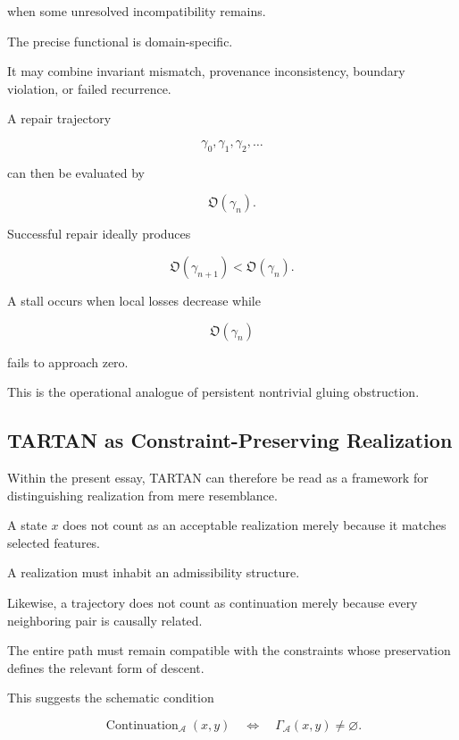 \documentclass[
  11pt,
  a4paper,
  DIV=12,
  BCOR=0mm,
  parskip=half-
]{scrartcl}
\newcommand{\Continuation}{\operatorname{Continuation}}
\theoremstyle{definition}
\theoremstyle{plain}
\theoremstyle{remark}
\begin{document}
when some unresolved incompatibility remains.

The precise functional is domain-specific.

It may combine invariant mismatch, provenance inconsistency, boundary
violation, or failed recurrence.

A repair trajectory

\[
  \gamma_0,
  \gamma_1,
  \gamma_2,
  \ldots
\]

can then be evaluated by

\[
  \mathfrak O(\gamma_n).
\]

Successful repair ideally produces

\[
  \mathfrak O(\gamma_{n+1})
  <
  \mathfrak O(\gamma_n).
\]

A stall occurs when local losses decrease while

\[
  \mathfrak O(\gamma_n)
\]

fails to approach zero.

This is the operational analogue of persistent nontrivial gluing obstruction.


\subsection{TARTAN as Constraint-Preserving Realization}
\label{app:tartan-interpretation}

Within the present essay, TARTAN can therefore be read as a framework for
distinguishing realization from mere resemblance.

A state \(x\) does not count as an acceptable realization merely because it
matches selected features.

A realization must inhabit an admissibility structure.

Likewise, a trajectory does not count as continuation merely because every
neighboring pair is causally related.

The entire path must remain compatible with the constraints whose preservation
defines the relevant form of descent.

This suggests the schematic condition

\[
  \Continuation_{\mathcal A}(x,y)
  \quad\Longleftrightarrow\quad
  \Gamma_{\mathcal A}(x,y)\neq\varnothing.
\]
\end{document}
